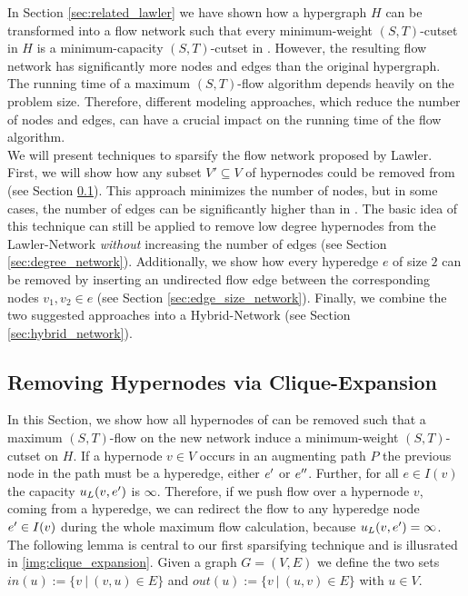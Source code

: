 
In Section \ref{sec:related_lawler} we have shown how a hypergraph $H$ can be transformed into 
a flow network  such that every minimum-weight $(S,T)$-cutset in $H$ is a
minimum-capacity $(S,T)$-cutset in  \cite{lawler1973}. However, the resulting flow
network has significantly more nodes and edges than the original hypergraph. The running time
of a maximum $(S,T)$-flow algorithm depends heavily on the problem size. 
Therefore, different modeling approaches, which reduce the number of nodes and edges,
can have a crucial impact on the running time of the flow algorithm. \\
We will present techniques to sparsify the flow network 
proposed by Lawler. First, we will show how any subset $V' \subseteq V$ of hypernodes could be removed 
from  (see Section \ref{sec:heuer_network}). This approach minimizes
the number of nodes, but in some cases, the number of edges can be
significantly higher than in . The basic idea of this technique 
can still be applied to remove low degree hypernodes from the Lawler-Network \emph{without} 
increasing the number of edges (see Section \ref{sec:degree_network}). Additionally, we show
how every hyperedge $e$ of size $2$ can be removed by inserting an undirected flow edge between
the corresponding nodes $v_1,v_2 \in e$  (see Section \ref{sec:edge_size_network}). 
Finally, we combine the two suggested approaches into a Hybrid-Network 
(see Section \ref{sec:hybrid_network}).



\subsection{Removing Hypernodes via Clique-Expansion}
\label{sec:heuer_network}

In this Section, we show how all hypernodes of  can be removed such that a maximum 
$(S,T)$-flow on the new network induce a minimum-weight $(S,T)$-cutset on $H$. If a hypernode $v \in V$
occurs in an augmenting path $P$ the previous node in the path must be a hyperedge, either
$e'$ or $e''$. Further, for all $e \in I(v)$ the capacity $u_L(v,e')$ is $\infty$. Therefore, 
if we push flow over a hypernode $v$, coming from a hyperedge, we can redirect
the flow to any hyperedge node $e' \in I(v)$ during the whole maximum flow calculation, because 
$u_L(v,e') = \infty$. The following lemma is central to our first sparsifying 
technique and is illusrated in \autoref{img:clique_expansion}. Given a graph $G = (V,E)$ we define the two sets
$in(u) := \{v\ |\ (v,u) \in E\}$ and $out(u) := \{v\ |\ (u,v) \in E\}$ with $u \in V$. 

